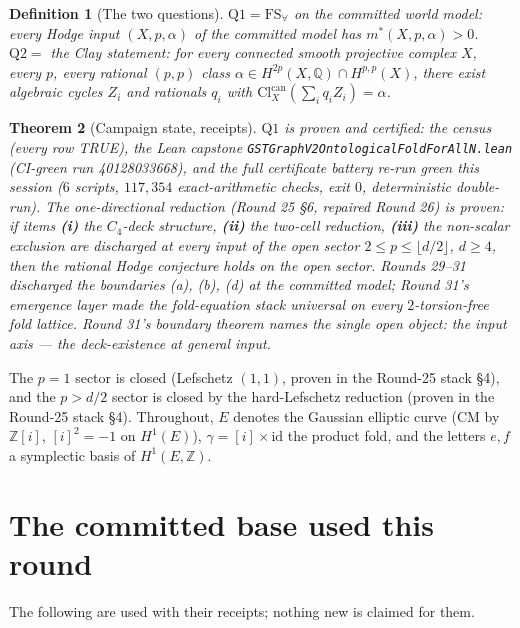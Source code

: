 \documentclass[11pt]{article}
\newtheorem{theorem}{Theorem}
\newtheorem{definition}[theorem]{Definition}
\newcommand{\Z}{\mathbb{Z}}
\newcommand{\Q}{\mathbb{Q}}
\begin{document}
\begin{definition}[The two questions]
$\mathrm{Q1}=\mathrm{FS}_\forall$ on the committed world model: every Hodge
input $(X,p,\alpha)$ of the committed model has $m^*(X,p,\alpha)>0$.
$\mathrm{Q2}=$ the Clay statement: for every connected smooth projective complex
$X$, every $p$, every rational $(p,p)$ class $\alpha\in H^{2p}(X,\Q)\cap H^{p,p}(X)$,
there exist algebraic cycles $Z_i$ and rationals $q_i$ with
$\mathrm{Cl}^{\mathrm{can}}_X(\sum_i q_i Z_i)=\alpha$.
\end{definition}

\begin{theorem}[Campaign state, receipts]\label{thm:base}
$\mathrm{Q1}$ is proven and certified: the census (every row TRUE), the Lean
capstone \texttt{GSTGraphV2OntologicalFoldForAllN.lean} (CI-green run
40128033668), and the full certificate battery re-run green this session
($6$ scripts, $117{,}354$ exact-arithmetic checks, exit $0$, deterministic
double-run). The one-directional reduction (Round 25 \S6, repaired Round 26)
is proven: if items \textbf{(i)} the $C_4$-deck structure, \textbf{(ii)} the
two-cell reduction, \textbf{(iii)} the non-scalar exclusion are discharged at
every input of the open sector $2\le p\le\lfloor d/2\rfloor$, $d\ge 4$, then the
rational Hodge conjecture holds on the open sector. Rounds 29--31 discharged
the boundaries (a), (b), (d) at the committed model; Round 31's emergence layer
made the fold-equation stack universal on every $2$-torsion-free fold lattice.
Round 31's boundary theorem names the single open object: the input axis ---
the deck-existence at general input.
\end{theorem}

\noindent The $p=1$ sector is closed (Lefschetz $(1,1)$, proven in the Round-25
stack \S4), and the $p>d/2$ sector is closed by the hard-Lefschetz reduction
(proven in the Round-25 stack \S4). Throughout, $E$ denotes the Gaussian
elliptic curve ($\mathrm{CM}$ by $\Z[i]$, $[i]^2=-1$ on $H^1(E)$), $\gamma=[i]\times\mathrm{id}$
the product fold, and the letters $e,f$ a symplectic basis of $H^1(E,\Z)$.

\section{The committed base used this round}

The following are used with their receipts; nothing new is claimed for them.
\end{document}
